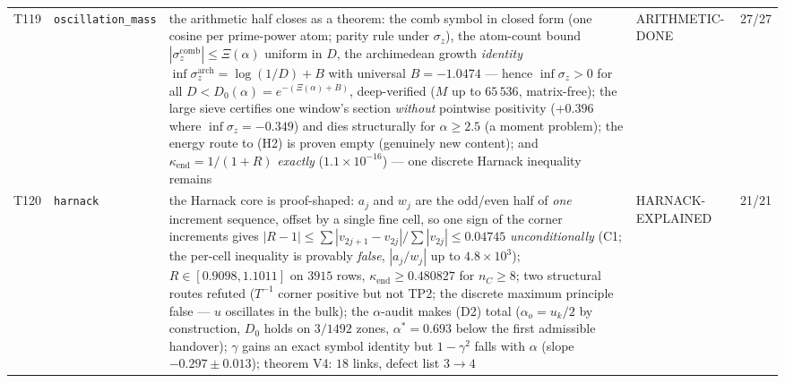 \documentclass[11pt,a4paper]{article}
\begin{document}
{\begin{xltabular}{\linewidth}{@{}p{0.95cm} >{\raggedright\arraybackslash}p{3.1cm} Y >{\raggedright\scriptsize\arraybackslash}p{3.35cm} p{1.15cm}@{}}
T119 & \texttt{\scriptsize oscillation\_\allowbreak mass} & the arithmetic half closes as a theorem: the comb symbol in closed form (one cosine per prime-power atom; parity rule under $\sigma_z$), the atom-count bound $|\sigma_z^{\mathrm{comb}}|\le\Xi(\alpha)$ uniform in $D$, the archimedean growth \emph{identity} $\inf\sigma_z^{\mathrm{arch}}=\log(1/D)+B$ with universal $B=-1.0474$ --- hence $\inf\sigma_z>0$ for all $D<D_0(\alpha)=e^{-(\Xi(\alpha)+B)}$, deep-verified ($M$ up to $65\,536$, matrix-free); the large sieve certifies one window's section \emph{without} pointwise positivity ($+0.396$ where $\inf\sigma_z=-0.349$) and dies structurally for $\alpha\ge2.5$ (a moment problem); the energy route to (H2) is proven empty (genuinely new content); and $\kappa_{\mathrm{end}}=1/(1+R)$ \emph{exactly} ($1.1\times10^{-16}$) --- one discrete Harnack inequality remains & ARITHMETIC-DONE & 27/27\\
T120 & \texttt{\scriptsize harnack} & the Harnack core is proof-shaped: $a_j$ and $w_j$ are the odd/even half of \emph{one} increment sequence, offset by a single fine cell, so one sign of the corner increments gives $|R-1|\le\sum|v_{2j+1}-v_{2j}|/\sum|v_{2j}|\le0.04745$ \emph{unconditionally} (C1; the per-cell inequality is provably \emph{false}, $|a_j/w_j|$ up to $4.8\times10^{3}$); $R\in[0.9098,1.1011]$ on $3915$ rows, $\kappa_{\mathrm{end}}\ge0.480827$ for $n_C\ge8$; two structural routes refuted ($T^{-1}$ corner positive but not TP2; the discrete maximum principle false --- $u$ oscillates in the bulk); the $\alpha$-audit makes (D2) total ($\alpha_o=u_k/2$ by construction, $D_0$ holds on $3/1492$ zones, $\alpha^*=0.693$ below the first admissible handover); $\gamma$ gains an exact symbol identity but $1-\gamma^2$ falls with $\alpha$ (slope $-0.297\pm0.013$); theorem V4: $18$ links, defect list $3\to4$ & HARNACK-EXPLAINED & 21/21\\

\end{xltabular}}
\end{document}
